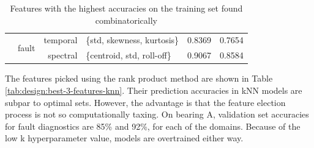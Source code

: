 \begin{table}[ht!]
\begin{adjustbox}{width=\textwidth}
\begin{tabular}{|r|r|r|l|r|r|}
                   & \multirow{2}{*}{fault}                        & temporal        & \{std, skewness, kurtosis\}      & 0.8369                & 0.7654 \\ \cline{3-6} 
                   &                                               & spectral        & \{centroid, std, roll-off\}     & 0.9067                & 0.8584               \\ \hline
\end{tabular}
\end{adjustbox}
\caption{Features with the highest accuracies on the training set found combinatorically}
\label{tab:design:feature-combinations-knn}
\end{table}

The features picked using the rank product method are shown in Table \ref{tab:design:best-3-features-knn}. Their prediction accuracies in kNN models are subpar to optimal sets. However, the advantage is that the feature election process is not so computationally taxing. On bearing A, validation set accuracies for fault diagnostics are 85\% and 92\%, for each of the domains. Because of the low k hyperparameter value, models are overtrained either way.

